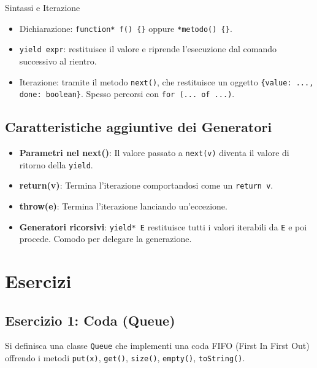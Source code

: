 \begin{definition}{Sintassi e Iterazione}
\begin{itemize}
    \item Dichiarazione: \texttt{function* f() \{\}} oppure \texttt{*metodo() \{\}}.
    \item \texttt{yield expr}: restituisce il valore e riprende l'esecuzione dal comando successivo al rientro.
    \item Iterazione: tramite il metodo \texttt{next()}, che restituisce un oggetto \texttt{\{value: ..., done: boolean\}}. Spesso percorsi con \texttt{for (... of ...)}.
\end{itemize}
\end{definition}

\subsection{Caratteristiche aggiuntive dei Generatori}
\begin{itemize}
    \item \textbf{Parametri nel next()}: Il valore passato a \texttt{next(v)} diventa il valore di ritorno della \texttt{yield}.
    \item \textbf{return(v)}: Termina l'iterazione comportandosi come un \texttt{return v}.
    \item \textbf{throw(e)}: Termina l'iterazione lanciando un'eccezione.
    \item \textbf{Generatori ricorsivi}: \texttt{yield* E} restituisce tutti i valori iterabili da \texttt{E} e poi procede. Comodo per delegare la generazione.
\end{itemize}

\section{Esercizi}

\subsection{Esercizio 1: Coda (Queue)}
Si definisca una classe \texttt{Queue} che implementi una coda FIFO (First In First Out) offrendo i metodi \texttt{put(x)}, \texttt{get()}, \texttt{size()}, \texttt{empty()}, \texttt{toString()}.


